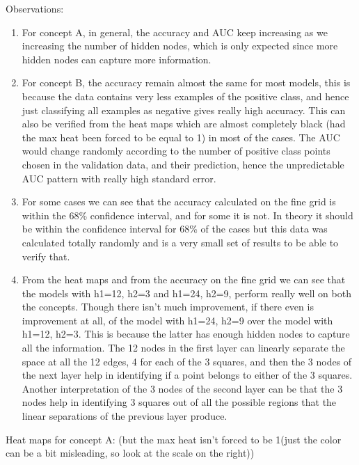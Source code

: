 \documentclass[twoside]{article}
\begin{document}
Observations:
\begin{enumerate}
	\item For concept A, in general, the accuracy and AUC keep increasing as we increasing the number of hidden nodes, which is only expected since more hidden nodes can capture more information.
	\item For concept B, the accuracy remain almost the same for most models, this is because the data contains very less examples of the positive class, and hence just classifying all examples as negative gives really high accuracy. This can also be verified from the heat maps which are almost completely black (had the max heat been forced to be equal to 1) in most of the cases. The AUC would change randomly according to the number of positive class points chosen in the validation data, and their prediction, hence the unpredictable AUC pattern with really high standard error.
	\item For some cases we can see that the accuracy calculated on the fine grid is within the 68\% confidence interval, and for some it is not. In theory it should be within the confidence interval for 68\% of the cases but this data was calculated totally randomly and is a very small set of results to be able to verify that.
	\item From the heat maps and from the accuracy on the fine grid we can see that the models with h1=12, h2=3 and h1=24, h2=9, perform really well on both the concepts. Though there isn't much improvement, if there even is improvement at all, of the model with h1=24, h2=9 over the model with h1=12, h2=3. This is because the latter has enough hidden nodes to capture all the information. The 12 nodes in the first layer can linearly separate the space at all the 12 edges, 4 for each of the 3 squares, and then the 3 nodes of the next layer help in identifying if a point belongs to either of the 3 squares. Another interpretation of the 3 nodes of the second layer can be that the 3 nodes help in identifying 3 squares out of all the possible regions that the linear separations of the previous layer produce.
\end{enumerate}

Heat maps for concept A: (but the max heat isn't forced to be 1(just the color can be a bit misleading, so look at the scale on the right))
\end{document}
